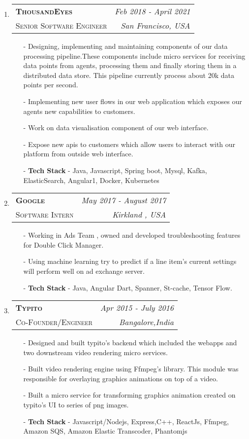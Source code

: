 \documentclass[letterpaper,10pt]{article}
\makeatletter
\newcommand{\workitem}[4]{
\begin{tabular*}{6.5in}{l @{\extracolsep{\fill}} r}
		\textbf{\textsc{#1}} & \textit{#2} \\
		\textsc{#3} & \textit{#4} \\
\end{tabular*}\vspace{-4pt}}
\newcommand{\workitemfull}[4]{
	\item[$\bullet$]\workitem{#1}{#2}{#3}{#4}
}
\makeatother
\begin{document}
\begin{enumerate}
	\workitemfull{ThousandEyes}{Feb 2018 - April 2021}{Senior Software Engineer}{San Francisco, USA}
	\begin{enumerate}
		\item[-] Designing, implementing and maintaining components of our data processing pipeline.These components include micro services for receiving data points from agents, processing them and finally storing them in a distributed data store. This pipeline currently process about 20k data points per second.
		\item[-] Implementing new user flows in our web application which exposes our agents new capabilities to customers.
		\item[-] Work on data visualisation component of our web interface. 
		\item[-] Expose new apis to customers which allow users to interact with our platform from outside web interface.
		\item[-] \textbf{Tech Stack} - Java, Javascript, Spring boot, Mysql, Kafka, ElasticSearch, Angular1, Docker, Kubernetes
	\end{enumerate}
	\workitemfull{Google}{May 2017 - August 2017}{Software Intern}{Kirkland , USA}
	\begin{enumerate}
		\item[-] Working in Ads Team , owned and developed troubleshooting features for Double Click Manager.  
		\item[-] Using machine learning try to predict if a line item's current settings will perform well on ad exchange server.
		\item[-] \textbf{Tech Stack} - Java, Angular Dart, Spanner, St-cache, Tensor Flow.
	\end{enumerate}
	\workitemfull{Typito}{Apr 2015 - July 2016}{Co-Founder/Engineer}{Bangalore,India}
	\begin{enumerate}
		\item[-] Designed and built typito's backend which included the webapps and two downstream video rendering micro services.
		\item[-] Built video rendering engine using Ffmpeg's library. This module was responsible for overlaying graphics animations on top of a video.
		\item[-] Built a micro service for transforming graphics animation created on typito's UI to series of png images.
		\item[-] \textbf{Tech Stack} - Javascript/Nodejs, Express,C++, ReactJs, Ffmpeg, Amazon SQS, Amazon Elastic Transcoder, Phantomjs
	\end{enumerate}


\end{enumerate}
\end{document}
